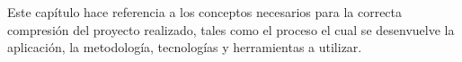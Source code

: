Este capítulo hace referencia a los conceptos necesarios para la correcta compresión del proyecto realizado, tales como el proceso el cual se desenvuelve la aplicación, la metodología, tecnologías y herramientas a utilizar.




